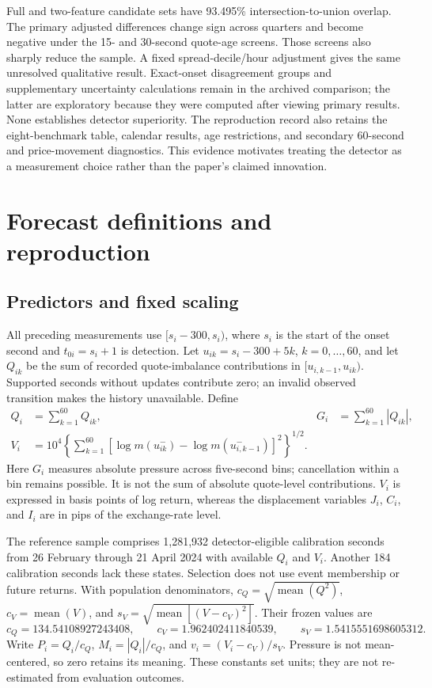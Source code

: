 \documentclass[12pt,letterpaper]{article}
\begin{document}
Full and two-feature candidate sets have 93.495\% intersection-to-union overlap. The primary adjusted differences change sign across quarters and become negative under the 15- and 30-second quote-age screens. Those screens also sharply reduce the sample. A fixed spread-decile/hour adjustment gives the same unresolved qualitative result. Exact-onset disagreement groups and supplementary uncertainty calculations remain in the archived comparison; the latter are exploratory because they were computed after viewing primary results. None establishes detector superiority. The reproduction record also retains the eight-benchmark table, calendar results, age restrictions, and secondary 60-second and price-movement diagnostics. This evidence motivates treating the detector as a measurement choice rather than the paper's claimed innovation.
\section{Forecast definitions and reproduction}
\label{app:forecasts}

\subsection{Predictors and fixed scaling}
\label{app:predictors}

All preceding measurements use $[s_i-300,s_i)$, where $s_i$ is the start of the onset second and $t_{0i}=s_i+1$ is detection. Let $u_{ik}=s_i-300+5k$, $k=0,\ldots,60$, and let $Q_{ik}$ be the sum of recorded quote-imbalance contributions in $[u_{i,k-1},u_{ik})$. Supported seconds without updates contribute zero; an invalid observed transition makes the history unavailable. Define
\begin{align}
Q_i&=\sum_{k=1}^{60}Q_{ik}, &
G_i&=\sum_{k=1}^{60}|Q_{ik}|,\\
V_i&=10^4\left\{\sum_{k=1}^{60}
 [\log m(u_{ik}^{-})-\log m(u_{i,k-1}^{-})]^2\right\}^{1/2}.
\end{align}
Here $G_i$ measures absolute pressure across five-second bins; cancellation within a bin remains possible. It is not the sum of absolute quote-level contributions. $V_i$ is expressed in basis points of log return, whereas the displacement variables $J_i$, $C_i$, and $I_i$ are in pips of the exchange-rate level.

The reference sample comprises 1,281,932 detector-eligible calibration seconds from 26 February through 21 April 2024 with available $Q_i$ and $V_i$. Another 184 calibration seconds lack these states. Selection does not use event membership or future returns. With population denominators, $c_Q=\sqrt{\operatorname{mean}(Q^2)}$, $c_V=\operatorname{mean}(V)$, and $s_V=\sqrt{\operatorname{mean}[(V-c_V)^2]}$. Their frozen values are
\[
 c_Q=134.54108927243408,\qquad
 c_V=1.962402411840539,\qquad
 s_V=1.5415551698605312.
\]
Write $P_i=Q_i/c_Q$, $M_i=|Q_i|/c_Q$, and $v_i=(V_i-c_V)/s_V$. Pressure is not mean-centered, so zero retains its meaning. These constants set units; they are not re-estimated from evaluation outcomes.
\end{document}
